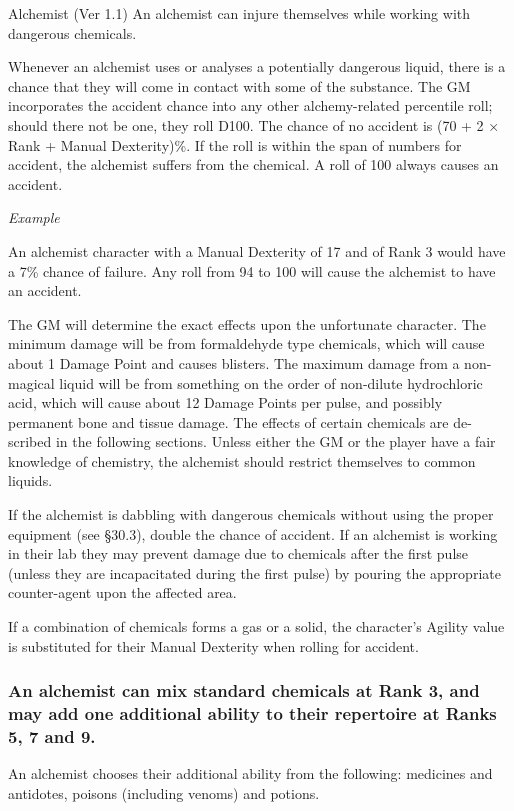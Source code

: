 \begin{Chapter}{Alchemist (Ver 1.1)}
An alchemist can injure themselves while working with dangerous
chemicals.

Whenever an alchemist uses or analyses a potentially dangerous liquid,
there is a chance that they will come in contact with some of the
substance.  The GM incorporates the accident chance into any other
alchemy-related percentile roll; should there not be one, they roll
D100.  The chance of no accident is (70 + 2 × Rank + Manual
Dexterity)\%.  If the roll is within the span of numbers for accident,
the alchemist suffers from the chemical.  A roll of 100 always causes
an accident.

\emph{Example}

An alchemist character with a Manual Dexterity of 17 and of
Rank 3 would have a 7\% chance of failure. Any roll from 94 to 100
will cause the alchemist to have an accident.

The GM will determine the exact effects upon the unfortunate
character.  The minimum damage will be from formaldehyde type
chemicals, which will cause about 1 Damage Point and causes blisters.
The maximum damage from a non-magical liquid will be from something on
the order of non-dilute hydrochloric acid, which will cause about 12
Damage Points per pulse, and possibly permanent bone and tissue
damage.  The effects of certain chemicals are de- scribed in the
following sections. Unless either the GM or the player have a fair
knowledge of chemistry, the alchemist should restrict themselves to
common liquids.

If the alchemist is dabbling with dangerous chemicals without using
the proper equipment (see §30.3), double the chance of accident. If an
alchemist is working in their lab they may prevent damage due to
chemicals after the first pulse (unless they are incapacitated during
the first pulse) by pouring the appropriate counter-agent upon the
affected area.

If a combination of chemicals forms a gas or a solid, the character’s
Agility value is substituted for their Manual Dexterity when rolling
for accident.

\subsubsection{An alchemist can mix standard chemicals at Rank 3, and may add one
additional ability to their repertoire at Ranks 5, 7 and 9.}

An alchemist chooses their additional ability from the following:
medicines and antidotes, poisons (including venoms) and potions.


\end{Chapter}
